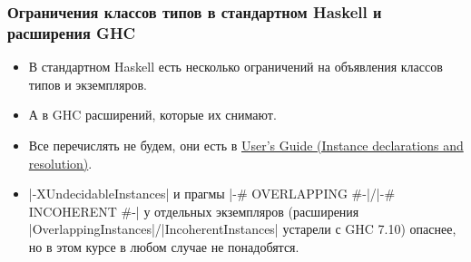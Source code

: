 \documentclass[10pt]{beamer}
\begin{document}
\begin{frame}[fragile]
  \frametitle{Ограничения классов типов в стандартном Haskell и расширения GHC}
  \begin{itemize}
    \item В стандартном Haskell есть несколько ограничений на объявления классов типов и экземпляров.
    \item А в GHC расширений, которые их снимают.
    \item Все перечислять не будем, они есть в \href{https://downloads.haskell.org/~ghc/latest/docs/html/users_guide/exts/instances.html}{User's Guide (Instance declarations and resolution)}.
    \item \haskinline|-XUndecidableInstances| и прагмы \haskinline|{-# OVERLAPPING #-}|/\haskinline|{-# INCOHERENT #-}| у отдельных экземпляров (расширения \haskinline|OverlappingInstances|/\haskinline|IncoherentInstances| устарели с GHC 7.10) опаснее, но в этом курсе в любом случае не понадобятся.
  \end{itemize}
\end{frame}
\end{document}
